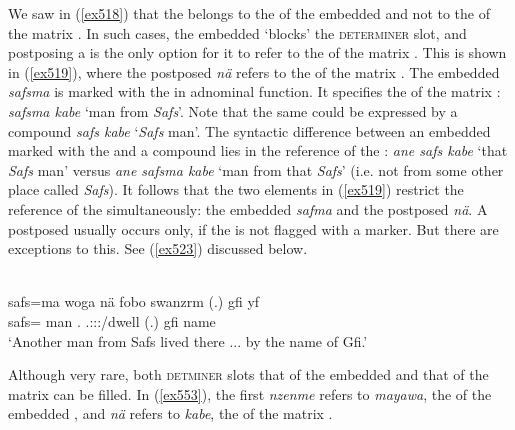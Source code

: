 We saw in (\ref{ex518}) that the  belongs to the  of the embedded  and not to the  of the matrix . In such cases, the embedded  `blocks' the \textsc{determiner} slot, and postposing a  is the only option for it to refer to the  of the matrix . This is shown in (\ref{ex519}), where the postposed  \emph{nä} refers to the  of the matrix . The embedded  \emph{safsma} is marked with the   in adnominal function. It specifies the  of the matrix : \emph{safsma kabe} `man from \emph{Safs}'. Note that the same could be expressed by a  compound \emph{safs kabe} `\emph{Safs} man'. The syntactic difference between an embedded  marked with the   and a  compound lies in the reference of the : \emph{ane safs kabe} `that \emph{Safs} man' versus \emph{ane safsma kabe} `man from that \emph{Safs}' (i.e. not from some other place called \emph{Safs}). It follows that the two elements in (\ref{ex519}) restrict the reference of the  simultaneously: the embedded  \emph{safma} and the postposed  \emph{nä}. A postposed  usually occurs only, if the  is not flagged with a  marker. But there are exceptions to this. See (\ref{ex523}) discussed below.

\begin{exe}
	\\
	\gll safs=ma woga nä fobo swanzrm (.) gfi yf\\
	safs=\Char{} man \Indf{} \Dist.\All{} \Tsg.\Masc:\Sbj:\Nonpast:\Ipfv/dwell (.) gfi name\\
	\trans `Another man from Safs lived there ... by the name of Gfi.'
	\label{ex519}
\end{exe}

Although very rare, both \textsc{detminer} slots \textendash{} that of the embedded  and that of the matrix  \textendash{} can be filled. In (\ref{ex553}), the first   \emph{nzenme} refers to \emph{mayawa}, the  of the embedded , and   \emph{nä} refers to \emph{kabe}, the  of the matrix .

